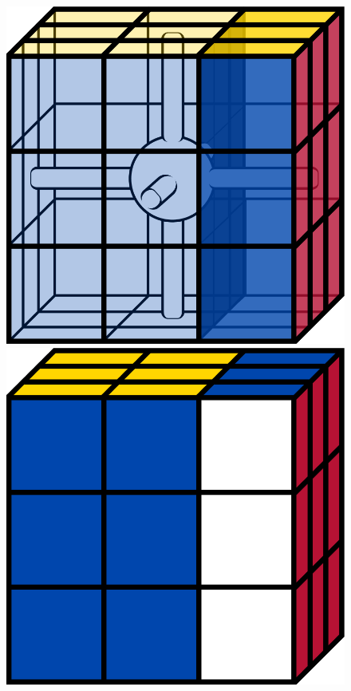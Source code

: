 \documentclass[12pt]{article}
\begin{document}
\begin{figure}[h]
\begin{minipage}[c]{0.2\textwidth}
        \includegraphics[scale=0.1]{moves/core_r_highlight.png}
    \end{minipage}
    \begin{minipage}[c]{0.05\textwidth}
        \centering
    \end{minipage}
    \hspace{0.5cm}
    \begin{minipage}[c]{0.2\textwidth}
        \includegraphics[scale=0.1]{moves/cube_r.png}

\end{minipage}
\end{figure}
\end{document}
